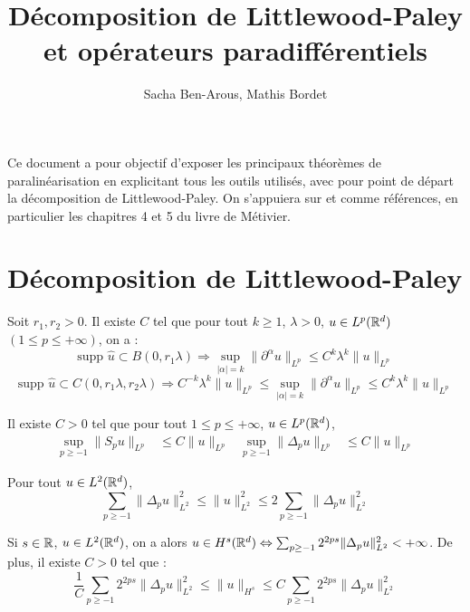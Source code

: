 \documentclass[11pt,a4paper]{article}
\title{\textbf{Décomposition de Littlewood-Paley et opérateurs paradifférentiels}}
\date{}
\author{Sacha Ben-Arous, Mathis Bordet}
\begin{document}
\maketitle

Ce document a pour objectif d'exposer les principaux théorèmes de paralinéarisation en explicitant tous les outils utilisés, avec pour point de départ la décomposition de Littlewood-Paley. On s'appuiera sur \cite{metivier} et \cite{dgv} comme références, en particulier les chapitres 4 et 5 du livre de Métivier.
\section{Décomposition de Littlewood-Paley}


\begin{thm}
Soit $r_1,r_2 >0$. Il existe $C$ tel que pour tout $k \geq 1$, $\lambda >0$, $u\in L^p(\mathbb R^d)$ $(1\leq p \leq +\infty)$, on a :
\begin{equation}\label{bernstein}
\text{supp } \hat{u} \subset B(0,r_1\lambda) \Rightarrow \sup_{|\alpha|=k} \|\partial^\alpha u\|_{L^p} \leq C^k \lambda^k \|u\|_{L^p}
\end{equation}
\begin{equation}
\text{supp } \hat{u} \subset C(0,r_1\lambda,r_2\lambda) \Rightarrow  C^{-k} \lambda^k \|u\|_{L^p} \leq \sup_{|\alpha|=k} \|\partial^\alpha u\|_{L^p} \leq C^k \lambda^k \|u\|_{L^p}
\end{equation}
\end{thm}


\begin{lemma}\label{young}
Il existe $C>0$ tel que pour tout $1\leq p \leq +\infty$, $u \in L^p(\mathbb R^d)$, 
\begin{align*}
\sup_{p\geq -1}\|S_pu\|_{L^p} &\leq C \|u\|_{L^p} & \sup_{p\geq -1}\|\Delta_pu\|_{L^p} &\leq C \|u\|_{L^p}
\end{align*}
\end{lemma}


\begin{lemma}
Pour tout $u\in L^2(\mathbb R^d)$, 
\begin{equation}\label{qortho}
\sum_{p \geq -1} \|\Delta_p u \|^2_{L^2} \leq \| u \|^2_{L^2} \leq 2 \sum_{p \geq -1} \|\Delta_p u \|^2_{L^2} 
\end{equation}
\end{lemma}


\begin{thm}
Si $s\in \mathbb R$, $u\in L^2(\mathbb R^d)$, on a alors $u\in H^s(\mathbb R^d) \Leftrightarrow \sum_{p\geq -1}2^{2ps}\|\Delta_p u \|_{L^2}^2 < +\infty$. De plus, il existe $C>0$ tel que :
\begin{equation}\label{carac_sobol}
\frac{1}{C}\sum_{p\geq -1}2^{2ps}\|\Delta_p u \|_{L^2}^2 \leq \|u\|_{H^s} \leq C \sum_{p\geq -1}2^{2ps}\|\Delta_p u \|_{L^2}^2 
\end{equation}
\end{thm}
\end{document}

